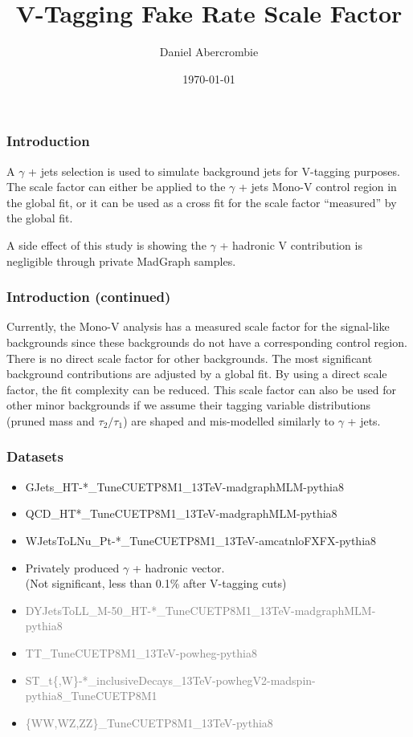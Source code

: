 \documentclass{beamer}
\author[D. Abercrombie]{
  Daniel Abercrombie
}
\title{\bf \sffamily V-Tagging Fake Rate Scale Factor}
\date{\today}
\begin{document}
\begin{frame}[nonumbering]
  \titlepage
\end{frame}

\begin{frame}
  \frametitle{Introduction}

  A $\gamma$ + jets selection is used to simulate background jets for V-tagging purposes.
  The scale factor can either be applied to the $\gamma$ + jets
  Mono-V control region in the global fit,
  or it can be used as a cross fit for the scale factor ``measured'' by the global fit.

  \vspace{24pt}

  A side effect of this study is showing the $\gamma$ + hadronic V
  contribution is negligible through private MadGraph samples.

\end{frame}


\begin{frame}
  \frametitle{Introduction (continued)}

  Currently, the Mono-V analysis has a measured scale factor for the signal-like backgrounds
  since these backgrounds do not have a corresponding control region.
  There is no direct scale factor for other backgrounds.
  The most significant background contributions are adjusted by a global fit.
  By using a direct scale factor, the fit complexity can be reduced.
  This scale factor can also be used for other minor backgrounds if we assume their
  tagging variable distributions (pruned mass and $\tau_2/\tau_1$)
  are shaped and mis-modelled similarly to $\gamma$ + jets.

\end{frame}

\begin{frame}
  \frametitle{Datasets}
  {\scriptsize
    \begin{itemize}
    \item GJets\_HT-*\_TuneCUETP8M1\_13TeV-madgraphMLM-pythia8
    \item QCD\_HT*\_TuneCUETP8M1\_13TeV-madgraphMLM-pythia8
    \item WJetsToLNu\_Pt-*\_TuneCUETP8M1\_13TeV-amcatnloFXFX-pythia8
    \item Privately produced $\gamma$ + hadronic vector. \\
      (Not significant, less than 0.1\% after V-tagging cuts)
    \item \textcolor{gray}{DYJetsToLL\_M-50\_HT-*\_TuneCUETP8M1\_13TeV-madgraphMLM-pythia8}
    \item \textcolor{gray}{TT\_TuneCUETP8M1\_13TeV-powheg-pythia8}
    \item \textcolor{gray}{ST\_t\{,W\}-*\_inclusiveDecays\_13TeV-powhegV2-madspin-pythia8\_TuneCUETP8M1}
    \item \textcolor{gray}{\{WW,WZ,ZZ\}\_TuneCUETP8M1\_13TeV-pythia8}
    \end{itemize}
  }
\end{frame}
\end{document}
